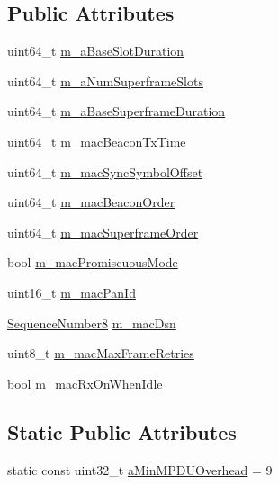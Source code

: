 \subsection*{Public Attributes}
\begin{DoxyCompactItemize}
\item 
uint64\+\_\+t \hyperlink{classns3_1_1LrWpanMac_aad2f54fa13df968bd5961770e76d6797}{m\+\_\+a\+Base\+Slot\+Duration}
\item 
uint64\+\_\+t \hyperlink{classns3_1_1LrWpanMac_a605adeb44cababfd27a444c1f1314412}{m\+\_\+a\+Num\+Superframe\+Slots}
\item 
uint64\+\_\+t \hyperlink{classns3_1_1LrWpanMac_a29030c0084946fb37198fa07da3a2b03}{m\+\_\+a\+Base\+Superframe\+Duration}
\item 
uint64\+\_\+t \hyperlink{classns3_1_1LrWpanMac_ae8d4ba1b1080f7b17adc8cdbaca6ff5a}{m\+\_\+mac\+Beacon\+Tx\+Time}
\item 
uint64\+\_\+t \hyperlink{classns3_1_1LrWpanMac_ae7628f67a7f4caa970097b915ed3c8e3}{m\+\_\+mac\+Sync\+Symbol\+Offset}
\item 
uint64\+\_\+t \hyperlink{classns3_1_1LrWpanMac_a1c5e50a030447b4352c932e9282c4371}{m\+\_\+mac\+Beacon\+Order}
\item 
uint64\+\_\+t \hyperlink{classns3_1_1LrWpanMac_ad4c7797599a4e04268e8d8cd16046769}{m\+\_\+mac\+Superframe\+Order}
\item 
bool \hyperlink{classns3_1_1LrWpanMac_aaf3802d8a9c98323a662b4e8209144e4}{m\+\_\+mac\+Promiscuous\+Mode}
\item 
uint16\+\_\+t \hyperlink{classns3_1_1LrWpanMac_abb75c742ae20c41dd10a721605328a82}{m\+\_\+mac\+Pan\+Id}
\item 
\hyperlink{group__network_ga7897a211607bda13fb584aec87cf78fc}{Sequence\+Number8} \hyperlink{classns3_1_1LrWpanMac_a8a24e6d96342082f7b0343bdd0800d8c}{m\+\_\+mac\+Dsn}
\item 
uint8\+\_\+t \hyperlink{classns3_1_1LrWpanMac_a4c627b0db8f366077e108ede4268cf7c}{m\+\_\+mac\+Max\+Frame\+Retries}
\item 
bool \hyperlink{classns3_1_1LrWpanMac_a0e100f9e642d0adce0e0a29384c535fc}{m\+\_\+mac\+Rx\+On\+When\+Idle}
\end{DoxyCompactItemize}
\subsection*{Static Public Attributes}
\begin{DoxyCompactItemize}
\item 
static const uint32\+\_\+t \hyperlink{classns3_1_1LrWpanMac_a49d8579fb79ba7a3a4eed04a375380c5}{a\+Min\+M\+P\+D\+U\+Overhead} = 9
\end{DoxyCompactItemize}
